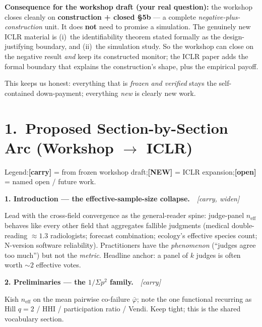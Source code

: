 \documentclass[11pt,a4paper]{article}
\begin{document}
\medskip
\noindent\textbf{Consequence for the workshop draft (your real question):} the workshop closes cleanly on \textbf{construction + closed \S5b} --- a complete \emph{negative-plus-construction} unit. It does \textbf{not} need to promise a simulation. The genuinely new ICLR material is (i)~the identifiability theorem stated formally as the design-justifying boundary, and (ii)~the simulation study. So the workshop can close on the negative result \emph{and} keep its constructed monitor; the ICLR paper adds the formal boundary that explains the construction's shape, plus the empirical payoff.

This keeps us honest: everything that is \emph{frozen and verified} stays the self-contained down-payment; everything \emph{new} is clearly new work.

\bigskip

\section*{1.\ Proposed Section-by-Section Arc (Workshop $\to$ ICLR)}

\noindent Legend:\quad\textbf{[carry]} = from frozen workshop draft;\quad\textbf{[NEW]} = ICLR expansion;\quad\textbf{[open]} = named open / future work.

\bigskip

\noindent\textbf{1. Introduction --- the effective-sample-size collapse.}\ \ \textit{[carry, widen]}

Lead with the cross-field convergence as the general-reader spine: judge-panel $n_{\text{eff}}$ behaves like every other field that aggregates fallible judgments (medical double-reading $\approx 1.3$ radiologists; forecast combination; ecology's effective species count; N-version software reliability). Practitioners have the \emph{phenomenon} (``judges agree too much'') but not the \emph{metric}. Headline anchor: a panel of $k$ judges is often worth ${\sim}2$ effective votes.

\medskip
\noindent\textbf{2. Preliminaries --- the $1/\Sigma p^2$ family.}\ \ \textit{[carry]}

Kish $n_{\text{eff}}$ on the mean pairwise co-failure $\bar\varphi$; note the one functional recurring as Hill $q{=}2$ / HHI / participation ratio / Vendi. Keep tight; this is the shared vocabulary section.
\end{document}
